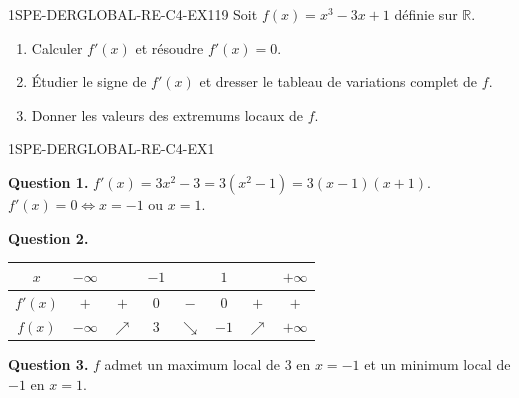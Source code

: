 

\begin{exercice}{1SPE-DERGLOBAL-RE-C4-EX1}{1}{9}
Soit $f(x) = x^3 - 3x + 1$ définie sur $\mathbb{R}$.
\begin{enumerate}
  \item Calculer $f'(x)$ et résoudre $f'(x) = 0$.
  \item Étudier le signe de $f'(x)$ et dresser le tableau de variations complet de $f$.
  \item Donner les valeurs des extremums locaux de $f$.
\end{enumerate}
\end{exercice}



\begin{corrige}{1SPE-DERGLOBAL-RE-C4-EX1}

\textbf{Question 1.}
$f'(x) = 3x^2 - 3 = 3(x^2-1) = 3(x-1)(x+1).$
$f'(x) = 0 \Leftrightarrow x = -1$ ou $x = 1.$

\textbf{Question 2.}
\begin{center}
\begin{tabular}{|c|ccccccc|}
\hline
$x$ & $-\infty$ & & $-1$ & & $1$ & & $+\infty$ \\
\hline
$f'(x)$ & $+$ & $+$ & $0$ & $-$ & $0$ & $+$ & $+$ \\
\hline
$f(x)$ & $-\infty$ & $\nearrow$ & $3$ & $\searrow$ & $-1$ & $\nearrow$ & $+\infty$ \\
\hline
\end{tabular}
\end{center}


\textbf{Question 3.}
$f$ admet un maximum local de $3$ en $x = -1$ et un minimum local de $-1$ en $x = 1$.

\end{corrige}

